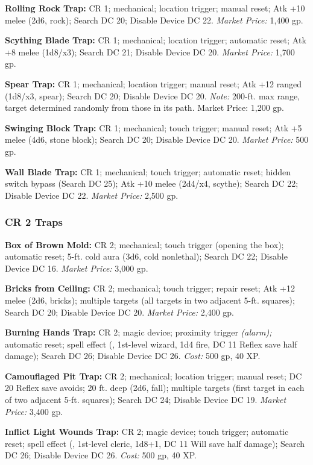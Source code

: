 \textbf{Rolling Rock Trap:} CR 1; mechanical; location trigger; manual reset; Atk 
+10 melee (2d6, rock); Search DC 20; Disable Device DC 22. \textit{Market Price: 
}1,400 gp.

\textbf{Scything Blade Trap:} CR 1; mechanical; location trigger; automatic reset; 
Atk +8 melee (1d8/x3); Search DC 21; Disable Device DC 20. \textit{Market Price: 
}1,700 gp.

\textbf{Spear Trap:} CR 1; mechanical; location trigger; manual reset; Atk +12 
ranged (1d8/x3, spear); Search DC 20; Disable Device DC 20. \textit{Note:} 200-ft. 
max range, target determined randomly from those in its path. Market Price: 1,200 
gp.

\textbf{Swinging Block Trap:} CR 1; mechanical; touch trigger; manual reset; Atk 
+5 melee (4d6, stone block); Search DC 20; Disable Device DC 20. \textit{Market 
Price:} 500 gp.

\textbf{Wall Blade Trap:} CR 1; mechanical; touch trigger; automatic reset; hidden 
switch bypass (Search DC 25); Atk +10 melee (2d4/x4, scythe); Search DC 22; Disable 
Device DC 22. \textit{Market Price:} 2,500 gp.

\subsubsection{CR 2 Traps}

\textbf{Box of Brown Mold:} CR 2; mechanical; touch trigger (opening the box); 
automatic reset; 5-ft. cold aura (3d6, cold nonlethal); Search DC 22; Disable Device 
DC 16. \textit{Market Price:} 3,000 gp.

\textbf{Bricks from Ceiling:} CR 2; mechanical; touch trigger; repair reset; Atk 
+12 melee (2d6, bricks); multiple targets (all targets in two adjacent 5-ft. squares); 
Search DC 20; Disable Device DC 20. \textit{Market Price:} 2,400 gp.

\textbf{Burning Hands Trap:} CR 2; magic device; proximity trigger 
\textit{(alarm); }automatic reset; spell effect (, 1st-level 
wizard, 1d4 fire, DC 11 Reflex save half damage); Search DC 26; Disable Device 
DC 26. \textit{Cost:} 500 gp, 40 XP.

\textbf{Camouflaged Pit Trap:} CR 2; mechanical; location trigger; manual reset; 
DC 20 Reflex save avoids; 20 ft. deep (2d6, fall); multiple targets (first target 
in each of two adjacent 5-ft. squares); Search DC 24; Disable Device DC 19. \textit{Market 
Price:} 3,400 gp.

\textbf{Inflict Light Wounds Trap:} CR 2; magic device; touch 
trigger; automatic reset; spell effect (, 1st-level 
cleric, 1d8+1, DC 11 Will save half damage); Search DC 26; Disable Device DC 26. 
\textit{Cost:} 500 gp, 40 XP.

